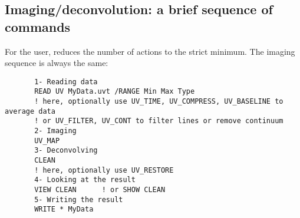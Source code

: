
\subsection{Imaging/deconvolution: a brief sequence of commands}
For the user, \imager{} reduces the number of actions to the strict minimum. 
The imaging sequence is always the same: 
\begin{verbatim}
       1- Reading data
       READ UV MyData.uvt /RANGE Min Max Type
       ! here, optionally use UV_TIME, UV_COMPRESS, UV_BASELINE to average data
       ! or UV_FILTER, UV_CONT to filter lines or remove continuum
       2- Imaging
       UV_MAP         
       3- Deconvolving
       CLEAN           
       ! here, optionally use UV_RESTORE
       4- Looking at the result
       VIEW CLEAN      ! or SHOW CLEAN     
       5- Writing the result 
       WRITE * MyData  
\end{verbatim}



